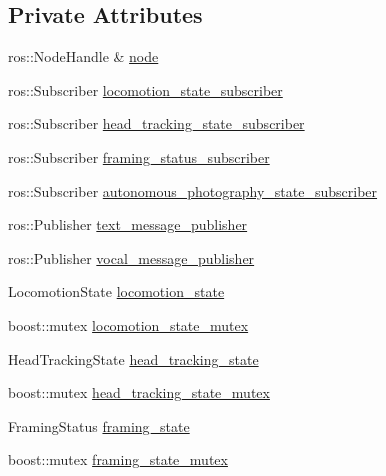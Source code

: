 \subsection*{\-Private \-Attributes}
\begin{DoxyCompactItemize}
\item 
ros\-::\-Node\-Handle \& \hyperlink{class_r_p_state_externalization_node_a54542d877247b1de7128918dc9face84}{node}
\item 
ros\-::\-Subscriber \hyperlink{class_r_p_state_externalization_node_a83a0b5013aaa3f576a66f5fdb0cd496e}{locomotion\-\_\-state\-\_\-subscriber}
\item 
ros\-::\-Subscriber \hyperlink{class_r_p_state_externalization_node_a198f8d63e01773bf468a72a291078ef2}{head\-\_\-tracking\-\_\-state\-\_\-subscriber}
\item 
ros\-::\-Subscriber \hyperlink{class_r_p_state_externalization_node_ae898595354bbe232f948f323a2b34f18}{framing\-\_\-status\-\_\-subscriber}
\item 
ros\-::\-Subscriber \hyperlink{class_r_p_state_externalization_node_ac79ccc93b04f57e17d5e1f0e225a5210}{autonomous\-\_\-photography\-\_\-state\-\_\-subscriber}
\item 
ros\-::\-Publisher \hyperlink{class_r_p_state_externalization_node_a7fb1584c32931b9d61d3f2f85a12ed8d}{text\-\_\-message\-\_\-publisher}
\item 
ros\-::\-Publisher \hyperlink{class_r_p_state_externalization_node_a78d2e05f5ef3b194b719a27b44db91d3}{vocal\-\_\-message\-\_\-publisher}
\item 
\-Locomotion\-State \hyperlink{class_r_p_state_externalization_node_ae89a6c952f36c49d866003753abd715f}{locomotion\-\_\-state}
\item 
boost\-::mutex \hyperlink{class_r_p_state_externalization_node_a85537f2d4c8e0f0da1992b609a9ac3cf}{locomotion\-\_\-state\-\_\-mutex}
\item 
\-Head\-Tracking\-State \hyperlink{class_r_p_state_externalization_node_acc0c8e8552825d4a9303cf59307c71af}{head\-\_\-tracking\-\_\-state}
\item 
boost\-::mutex \hyperlink{class_r_p_state_externalization_node_a2b35dbb15cc044ca7d0847d46569b234}{head\-\_\-tracking\-\_\-state\-\_\-mutex}
\item 
\-Framing\-Status \hyperlink{class_r_p_state_externalization_node_ad435064482aa0df8a11a8b52d9e2e503}{framing\-\_\-state}
\item 
boost\-::mutex \hyperlink{class_r_p_state_externalization_node_aeb8321c04369d904cdb73b4f8b86c30d}{framing\-\_\-state\-\_\-mutex}

\end{DoxyCompactItemize}
